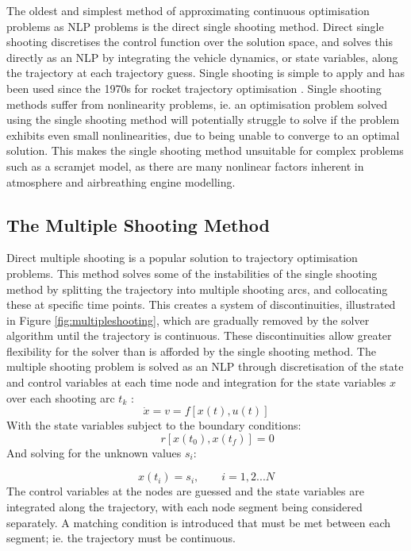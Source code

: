 The oldest and simplest method of approximating continuous optimisation problems as NLP problems is the direct single shooting method. Direct single shooting discretises the control function over the solution space, and solves this directly as an NLP by integrating the vehicle dynamics, or state variables, along the trajectory at each trajectory guess. Single shooting is simple to apply and has been used since the 1970s for rocket trajectory optimisation \cite{jezewski1971}. Single shooting methods suffer from nonlinearity problems, ie. an optimisation problem solved using the single shooting method will potentially struggle to solve if the problem exhibits even small nonlinearities, due to being unable to converge to an optimal solution. This makes the single shooting method unsuitable for complex problems such as a scramjet model, as there are many nonlinear factors inherent in atmosphere and airbreathing engine modelling. 
\subsection{The Multiple Shooting Method}



Direct multiple shooting is a popular solution to trajectory optimisation problems. This method solves some of the instabilities of the single shooting method by splitting the trajectory into multiple shooting arcs, and collocating these at specific time points. This creates a system of discontinuities, illustrated in Figure \ref{fig:multipleshooting}, which are gradually removed by the solver algorithm until the trajectory is continuous. These discontinuities allow greater flexibility for the solver than is afforded by the single shooting method. The multiple shooting problem is solved as an NLP through discretisation of the state and control variables at each time node and integration for the state variables $x$ over each shooting arc $t_k$ \cite{Subchan2008}:
\begin{equation}
\dot{x} = v = f[x(t),u(t)]
\end{equation}
With the state variables subject to the boundary conditions:
\begin{equation}
\qquad r[x(t_0),x(t_f)] = 0
\end{equation}
And solving for the unknown values $s_i$:

\begin{equation}
x(t_i) = s_i, \qquad i = 1,2...N
\end{equation}
The control variables at the nodes are guessed and the state variables are integrated along the trajectory, with each node segment being considered separately. A matching condition is introduced that must be met between each segment; ie. the trajectory must be continuous. \cite{Michalik2009}

